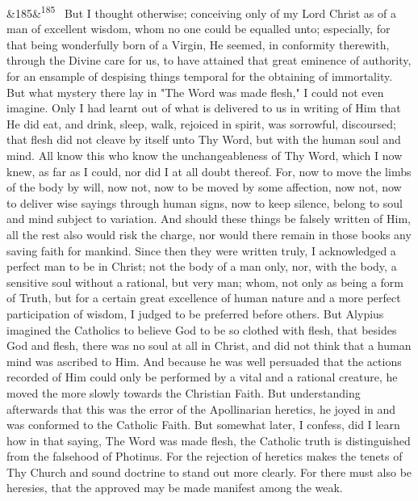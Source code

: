 \documentclass[12pt]{article}
\newcommand{\para}[1][]{\par\noindent\ifx&#1&\else\textsuperscript{\footnotesize #1}~\fi}
\begin{document}
\para[185] But I thought otherwise; conceiving only of my Lord Christ as of a man of excellent wisdom, whom no one could be equalled unto; especially, for that being wonderfully born of a Virgin, He seemed, in conformity therewith, through the Divine care for us, to have attained that great eminence of authority, for an ensample of despising things temporal for the obtaining of immortality. But what mystery there lay in "The Word was made flesh," I could not even imagine. Only I had learnt out of what is delivered to us in writing of Him that He did eat, and drink, sleep, walk, rejoiced in spirit, was sorrowful, discoursed; that flesh did not cleave by itself unto Thy Word, but with the human soul and mind. All know this who know the unchangeableness of Thy Word, which I now knew, as far as I could, nor did I at all doubt thereof. For, now to move the limbs of the body by will, now not, now to be moved by some affection, now not, now to deliver wise sayings through human signs, now to keep silence, belong to soul and mind subject to variation. And should these things be falsely written of Him, all the rest also would risk the charge, nor would there remain in those books any saving faith for mankind. Since then they were written truly, I acknowledged a perfect man to be in Christ; not the body of a man only, nor, with the body, a sensitive soul without a rational, but very man; whom, not only as being a form of Truth, but for a certain great excellence of human nature and a more perfect participation of wisdom, I judged to be preferred before others. But Alypius imagined the Catholics to believe God to be so clothed with flesh, that besides God and flesh, there was no soul at all in Christ, and did not think that a human mind was ascribed to Him. And because he was well persuaded that the actions recorded of Him could only be performed by a vital and a rational creature, he moved the more slowly towards the Christian Faith. But understanding afterwards that this was the error of the Apollinarian heretics, he joyed in and was conformed to the Catholic Faith. But somewhat later, I confess, did I learn how in that saying, The Word was made flesh, the Catholic truth is distinguished from the falsehood of Photinus. For the rejection of heretics makes the tenets of Thy Church and sound doctrine to stand out more clearly. For there must also be heresies, that the approved may be made manifest among the weak.
\end{document}
